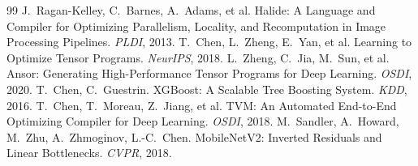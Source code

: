 \documentclass[11pt,a4paper]{ctexart}
\begin{document}
\begin{thebibliography}{99}
 J.~Ragan-Kelley, C.~Barnes, A.~Adams, et al. Halide: A Language and Compiler for Optimizing Parallelism, Locality, and Recomputation in Image Processing Pipelines. \emph{PLDI}, 2013.
 T.~Chen, L.~Zheng, E.~Yan, et al. Learning to Optimize Tensor Programs. \emph{NeurIPS}, 2018.
 L.~Zheng, C.~Jia, M.~Sun, et al. Ansor: Generating High-Performance Tensor Programs for Deep Learning. \emph{OSDI}, 2020.
 T.~Chen, C.~Guestrin. XGBoost: A Scalable Tree Boosting System. \emph{KDD}, 2016.
 T.~Chen, T.~Moreau, Z.~Jiang, et al. TVM: An Automated End-to-End Optimizing Compiler for Deep Learning. \emph{OSDI}, 2018.
 M.~Sandler, A.~Howard, M.~Zhu, A.~Zhmoginov, L.-C.~Chen. MobileNetV2: Inverted Residuals and Linear Bottlenecks. \emph{CVPR}, 2018.
\end{thebibliography}
\end{document}
